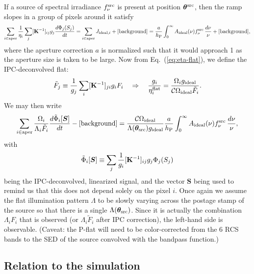 \documentclass[prd,onecolumn,nofootinbib,nobibnotes]{revtex4}
\begin{document}
If a source of spectral irradiance $f_\nu^{\rm src}$ is present at position ${\boldsymbol\theta}^{\rm src}$, then the ramp slopes in a group of pixels around it satisfy
\begin{equation}
\sum_{i\in\rm aper} \frac{1}{\eta_i} \sum_{j} [{\bf K}^{-1}]_{ij} g_j \frac{d\Phi_j(S_j)}{dt} = 
 \sum_{i\in\rm aper} J_{{\rm ideal},i} + [{\rm background}] =
 \frac{a}{h_{\rm P}} \int_0^\infty A_{\rm ideal}(\nu) f_\nu^{\rm src}\,\frac{d\nu}\nu + [{\rm background}],
\end{equation}
where the aperture correction $a$ is normalized such that it would approach 1 as the aperture size is taken to be large. Now from Eq.~(\ref{eq:eta-flat}), we define the IPC-deconvolved flat:
\begin{equation}
\tilde F_j \equiv \frac1{g_j} \sum_i [{\bf K}^{-1}]_{ji} g_i  F_i
~~~ \Rightarrow ~~~
\frac{g_i}{\eta_i^{\rm flat}} = \frac{\Omega_i g_{\rm ideal}}{{\cal C} \Omega_{\rm ideal} \tilde F_i}.
\label{eq:tilde-F}
\end{equation}
We may then write
\begin{equation}
\sum_{i\in\rm aper} \frac{\Omega_i}{ \Lambda_i \tilde F_i}\frac{d\tilde\Phi_i[{\boldsymbol S}]}{dt}- [{\rm background}] 
= 
\frac{{\cal C}\Omega_{\rm ideal}}{\Lambda({\boldsymbol\theta}_{\rm src}) g_{\rm ideal}} \frac{a}{h_{\rm P}} \int_0^\infty A_{\rm ideal}(\nu) f_\nu^{\rm src}\,\frac{d\nu}\nu,
\label{eq:s-aper}
\end{equation}
with
\begin{equation}
\tilde\Phi_i[{\boldsymbol S}] \equiv \sum_{j} 
\frac1{g_i} [{\bf K}^{-1}]_{ij} g_j \Phi_j(S_j) 
\end{equation}
being the IPC-deconvolved, linearized signal, and the vector ${\boldsymbol S}$ being used to remind us that this does not depend solely on the pixel $i$.
Once again we assume the flat illumination pattern $\Lambda$ to be slowly varying across the postage stamp of the source so that there is a single $\Lambda({\boldsymbol\theta}_{\rm src})$. Since it is actually the combination $\Lambda_i F_i$ that is observed (or $\Lambda_i \tilde F_i$ after IPC correction), the left-hand side is observable. (Caveat: the P-flat will need to be color-corrected from the 6 RCS bands to the SED of the source convolved with the bandpass function.)

\subsection{Relation to the simulation}
\end{document}
